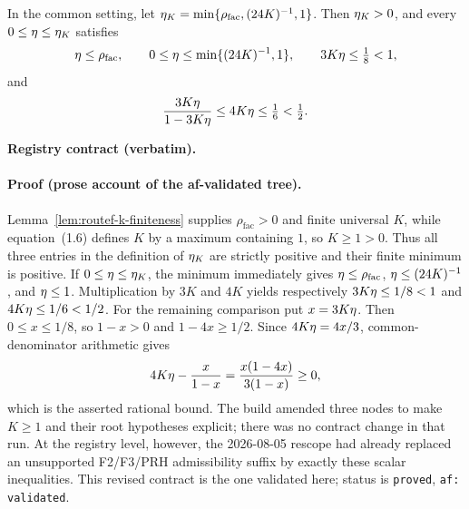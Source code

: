 \begin{lemma}\label{lem:routef-threshold-minimum}
In the common setting, let
$\eta_K=\min\{\rho_{\mathrm{fac}},(24K)^{-1},1\}$. Then $\eta_K>0$, and every
$0\le\eta\le\eta_K$ satisfies
\[
 \eta\le\rho_{\mathrm{fac}},\qquad
 0\le\eta\le\min\{(24K)^{-1},1\},\qquad
 3K\eta\le\tfrac18<1,
\]
and
\[
 \frac{3K\eta}{1-3K\eta}\le4K\eta\le\tfrac16<\tfrac12.
\]
\end{lemma}
\noindent\textbf{Registry contract (verbatim).} 
\paragraph{Proof (prose account of the af-validated tree).}
Lemma~\ref{lem:routef-k-finiteness} supplies $\rho_{\mathrm{fac}}>0$ and finite universal
$K$, while equation~(1.6) defines $K$ by a maximum containing $1$, so $K\ge1>0$.
Thus all three entries in the definition of $\eta_K$ are strictly positive and their
finite minimum is positive. If $0\le\eta\le\eta_K$, the minimum immediately gives
$\eta\le\rho_{\mathrm{fac}}$, $\eta\le(24K)^{-1}$, and $\eta\le1$.
Multiplication by $3K$ and $4K$ yields respectively
$3K\eta\le1/8<1$ and $4K\eta\le1/6<1/2$. For the remaining comparison put
$x=3K\eta$. Then $0\le x\le1/8$, so $1-x>0$ and $1-4x\ge1/2$. Since
$4K\eta=4x/3$, common-denominator arithmetic gives
\[
 4K\eta-\frac{x}{1-x}=\frac{x(1-4x)}{3(1-x)}\ge0,
\]
which is the asserted rational bound. The build amended three nodes to make $K\ge1$ and
their root hypotheses explicit; there was no contract change in that run. At the registry
level, however, the 2026-08-05 rescope had already replaced an unsupported F2/F3/PRH
admissibility suffix by exactly these scalar inequalities. This revised contract is the one
validated here; status is \texttt{proved}, \texttt{af: validated}.
